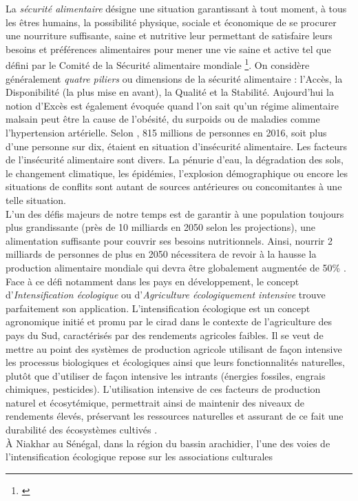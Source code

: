 La \emph{sécurité alimentaire} désigne \og une situation garantissant à tout moment, à tous les êtres humains, la possibilité physique, sociale et économique 
de se procurer une nourriture suffisante, saine et nutritive leur permettant de satisfaire leurs besoins et préférences alimentaires pour mener une vie saine et active \fg{} 
tel que défini par le Comité de la Sécurité alimentaire mondiale \footnote{\citep{ComitedelaSecuriteAlimentaireMondiale2012}}. On considère généralement \emph {quatre piliers} ou dimensions de la sécurité alimentaire : l'Accès, la Disponibilité 
(la plus mise en avant), la Qualité et la Stabilité. Aujourd'hui la notion d'Excès est également évoquée quand l'on sait qu'un régime alimentaire malsain peut être la cause de 
l'obésité, du surpoids ou de maladies comme l'hypertension artérielle. Selon \citep{FAO2017}, 815 millions de personnes en 2016, soit plus d'une personne sur dix, étaient en situation 
d'insécurité alimentaire. Les facteurs de l'insécurité alimentaire sont divers. La pénurie d'eau, la dégradation des sols, le changement climatique, les épidémies, 
l'explosion démographique ou encore les situations de conflits sont autant de sources antérieures ou concomitantes à une telle situation. \\L'un des défis majeurs de notre temps est de garantir à une 
population toujours plus grandissante (près de 10 milliards en 2050 selon les projections), une alimentation suffisante pour couvrir ses besoins nutritionnels. 
Ainsi, nourrir 2 milliards de personnes de plus en 2050 nécessitera de revoir à la hausse la production alimentaire mondiale qui devra être globalement augmentée de 50\% . Face à ce défi notamment dans les pays en développement, le concept \og d'\emph{Intensification écologique} ou d'\emph{Agriculture écologiquement intensive} \fg{} trouve 
parfaitement son application. L'intensification écologique est un concept agronomique initié et promu par le \acrshort{cirad} dans le contexte de l'agriculture des pays du Sud, caractérisés par des 
rendements agricoles faibles. Il se veut de mettre au point des systèmes de production agricole utilisant de façon intensive les processus biologiques et écologiques ainsi que leurs 
fonctionnalités naturelles, plutôt que d'utiliser de façon intensive les intrants (énergies fossiles, engrais chimiques, pesticides). L'utilisation intensive de ces facteurs de 
production naturel et écosytémique, permettrait ainsi de maintenir des niveaux de rendements élevés, préservant les ressources naturelles et assurant de ce fait une durabilité des
écosystèmes cultivés \citep{Goulet2012}.\\ \`A Niakhar au Sénégal, dans la région du bassin arachidier, l'une des voies de l'intensification écologique repose sur les associations culturales 
